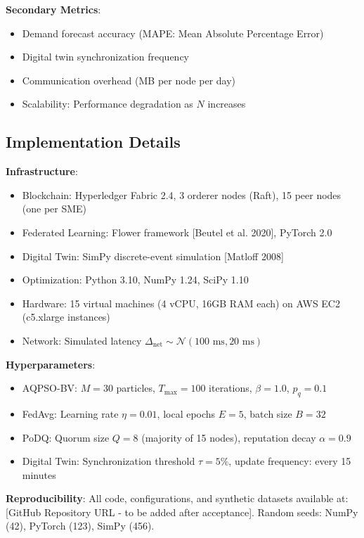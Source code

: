 \documentclass[times,10pt,twocolumn]{jucs2e}
\begin{document}
\textbf{Secondary Metrics}:
\begin{itemize}
\item Demand forecast accuracy (MAPE: Mean Absolute Percentage Error)
\item Digital twin synchronization frequency
\item Communication overhead (MB per node per day)
\item Scalability: Performance degradation as $N$ increases
\end{itemize}

\subsection{Implementation Details}

\textbf{Infrastructure}:
\begin{itemize}
\item Blockchain: Hyperledger Fabric 2.4, 3 orderer nodes (Raft), 15 peer nodes (one per SME)
\item Federated Learning: Flower framework [Beutel et al. 2020], PyTorch 2.0
\item Digital Twin: SimPy discrete-event simulation [Matloff 2008]
\item Optimization: Python 3.10, NumPy 1.24, SciPy 1.10
\item Hardware: 15 virtual machines (4 vCPU, 16GB RAM each) on AWS EC2 (c5.xlarge instances)
\item Network: Simulated latency $\Delta_{\text{net}} \sim \mathcal{N}(100 \text{ ms}, 20 \text{ ms})$
\end{itemize}

\textbf{Hyperparameters}:
\begin{itemize}
\item AQPSO-BV: $M = 30$ particles, $T_{\max} = 100$ iterations, $\beta = 1.0$, $p_q = 0.1$
\item FedAvg: Learning rate $\eta = 0.01$, local epochs $E = 5$, batch size $B = 32$
\item PoDQ: Quorum size $Q = 8$ (majority of 15 nodes), reputation decay $\alpha = 0.9$
\item Digital Twin: Synchronization threshold $\tau = 5\%$, update frequency: every 15 minutes
\end{itemize}

\textbf{Reproducibility}: All code, configurations, and synthetic datasets available at: [GitHub Repository URL - to be added after acceptance]. Random seeds: NumPy (42), PyTorch (123), SimPy (456).
\end{document}
